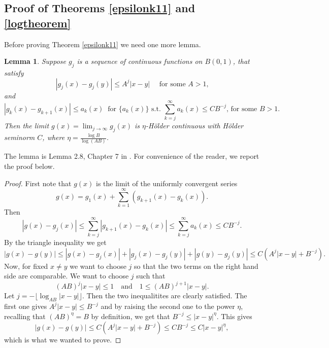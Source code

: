 \documentclass[11pt, twoside, leqno]{article}
\numberwithin{equation}{section}
\theoremstyle{plain}
\newtheorem{lem}[thm]{Lemma}
\theoremstyle{definition}
\begin{document}
\subsection{Proof of Theorems \ref{epsilonk11} and \ref{logtheorem}} \label{proof}

Before proving Theorem \ref{epsilonk11} we need one more lemma.

\begin{lem} \label{stein}
Suppose $g_j$ is a sequence of continuous functions on $B(0,1)$, that satisfy
\begin{equation}
|g_j(x)-g_j(y)| \leq A^j |x-y| \quad \text{ for some $A>1$,}
\end{equation}
and
\begin{equation}
|g_k(x)-g_{k+1}(x)| \leq a_k(x) \ \text{ for $\{a_k(x)\}$ s.t. $\sum_{k= j}^{\infty}a_k(x) \leq C B^{-j}$, for some $B>1$}.
\end{equation}
Then the limit $g(x)=\lim_{j \to \infty}g_j(x)$ is $\eta$-H\"{o}lder continuous with H\"{o}lder seminorm $C$, where $\eta=\frac{\log B}{\log(AB)}$.
\end{lem}
The lemma is Lemma 2.8, Chapter 7 in \cite{steinshakarchi}. For convenience of the reader, we report the proof below.

\begin{proof}
First note that $g(x)$ is the limit of the uniformly convergent series
\begin{equation}
g(x)=g_1(x) + \sum_{k=1}^{\infty} (g_{k+1}(x)-g_k(x)).
\end{equation}
Then
\begin{equation}
|g(x)-g_j(x)| \leq \sum_{k=j}^{\infty} |g_{k+1}(x)-g_k(x)| \leq \sum_{k=j}^{\infty} a_k(x) \leq C B^{-j}.
\end{equation}
By the triangle inequality we get
\begin{equation}
|g(x)-g(y)| \leq |g(x)-g_j(x)| + |g_j(x)-g_j(y)|+ |g(y) -g_j(y)| \leq C(A^j |x-y| + B^{-j}).
\end{equation}
Now, for fixed $x \neq y$ we want to choose $j$ so that the two terms on the right hand side are comparable.
We want to choose $j$ such that 
\begin{equation}
(AB)^j|x-y|\leq 1 \quad \text{and} \quad 1 \leq (AB)^{j+1}|x-y|.
\end{equation}
Let $j=-\lfloor \log_{AB}|x-y| \rfloor$. Then the two inequalitites are clearly satisfied. The first one gives $A^j |x-y| \leq B^{-j}$ and by raising the second one to the power $\eta$, recalling that $(AB)^{\eta}=B$ by definition, we get that $B^{-j}\leq  |x-y|^{\eta}$. This gives
\begin{equation}
|g(x)-g(y)| \leq C(A^j |x-y| + B^{-j}) \leq C B^{-j} \leq C |x-y|^{\eta},
\end{equation}
which is what we wanted to prove.
\end{proof}
\end{document}
